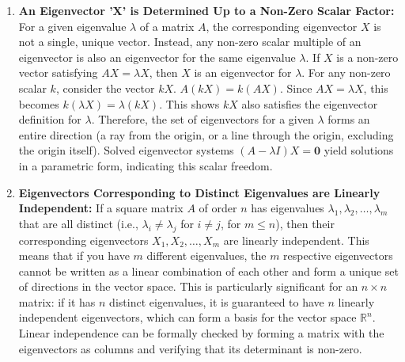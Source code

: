 \documentclass{article}
\begin{document}
\begin{enumerate}
    \item \textbf{An Eigenvector 'X' is Determined Up to a Non-Zero Scalar Factor:}
    For a given eigenvalue $\lambda$ of a matrix $A$, the corresponding eigenvector $X$ is not a single, unique vector. Instead, any non-zero scalar multiple of an eigenvector is also an eigenvector for the same eigenvalue $\lambda$.
    If $X$ is a non-zero vector satisfying $AX = \lambda X$, then $X$ is an eigenvector for $\lambda$. For any non-zero scalar $k$, consider the vector $kX$. $A(kX) = k(AX)$. Since $AX = \lambda X$, this becomes $k(\lambda X) = \lambda (kX)$. This shows $kX$ also satisfies the eigenvector definition for $\lambda$.
    Therefore, the set of eigenvectors for a given $\lambda$ forms an entire direction (a ray from the origin, or a line through the origin, excluding the origin itself). Solved eigenvector systems $(A - \lambda I)X = \mathbf{0}$ yield solutions in a parametric form, indicating this scalar freedom.

    \vspace{0.5\baselineskip} %

    \item \textbf{Eigenvectors Corresponding to Distinct Eigenvalues are Linearly Independent:}
    If a square matrix $A$ of order $n$ has eigenvalues $\lambda_1, \lambda_2, \dots, \lambda_m$ that are all distinct (i.e., $\lambda_i \neq \lambda_j$ for $i \neq j$, for $m \leq n$), then their corresponding eigenvectors $X_1, X_2, \dots, X_m$ are linearly independent.
    This means that if you have $m$ different eigenvalues, the $m$ respective eigenvectors cannot be written as a linear combination of each other and form a unique set of directions in the vector space. This is particularly significant for an $n \times n$
matrix: if it has $n$ distinct eigenvalues, it is guaranteed to have $n$ linearly independent eigenvectors, which can form a basis for the vector space $\mathbb{R}^n$. Linear independence can be formally checked by forming a matrix with the eigenvectors as columns and verifying that its determinant is non-zero.

    \vspace{0.5\baselineskip}


\end{enumerate}
\end{document}
